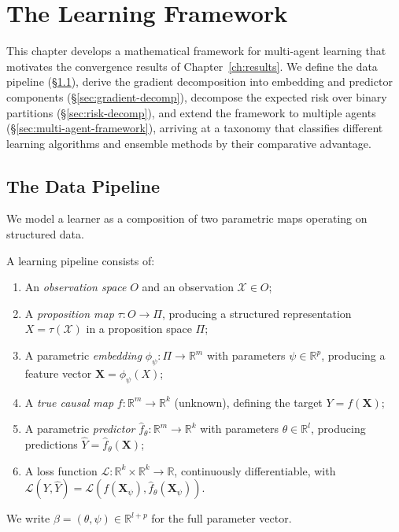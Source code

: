 \chapter{The Learning Framework}
\label{ch:framework}

This chapter develops a mathematical framework for multi-agent learning that motivates the convergence results of Chapter~\ref{ch:results}. We define the data pipeline (\S\ref{sec:pipeline}), derive the gradient decomposition into embedding and predictor components (\S\ref{sec:gradient-decomp}), decompose the expected risk over binary partitions (\S\ref{sec:risk-decomp}), and extend the framework to multiple agents (\S\ref{sec:multi-agent-framework}), arriving at a taxonomy that classifies different learning algorithms and ensemble methods by their comparative advantage.


\section{The Data Pipeline}
\label{sec:pipeline}

We model a learner as a composition of two parametric maps operating on structured data.

\begin{definition}
\label{def:pipeline}
A learning pipeline consists of:
\begin{enumerate}[label=(\roman*)]
    \item An \emph{observation space} $O$ and an observation $\mathcal{X} \in O$;
    \item A \emph{proposition map} $\tau: O \to \Pi$, producing a structured representation $X = \tau(\mathcal{X})$ in a proposition space $\Pi$;
    \item A parametric \emph{embedding} $\phi_\psi: \Pi \to \mathbb{R}^m$ with parameters $\psi \in \mathbb{R}^p$, producing a feature vector $\mathbf{X} = \phi_\psi(X)$;
    \item A \emph{true causal map} $f: \mathbb{R}^m \to \mathbb{R}^k$ (unknown), defining the target $Y = f(\mathbf{X})$;
    \item A parametric \emph{predictor} $\hat{f}_\theta: \mathbb{R}^m \to \mathbb{R}^k$ with parameters $\theta \in \mathbb{R}^l$, producing predictions $\hat{Y} = \hat{f}_\theta(\mathbf{X})$;
    \item A loss function $\mathcal{L}: \mathbb{R}^k \times \mathbb{R}^k \to \mathbb{R}$, continuously differentiable, with $\mathcal{L}(Y, \hat{Y}) = \mathcal{L}(f(\mathbf{X}_\psi), \hat{f}_\theta(\mathbf{X}_\psi))$.
\end{enumerate}
We write $\beta = (\theta, \psi) \in \mathbb{R}^{l+p}$ for the full parameter vector.
\end{definition}


